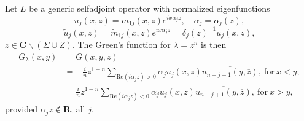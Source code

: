 \documentclass{surv-l}
\theoremstyle{plain}
\theoremstyle{definition}
\numberwithin{equation}{chapter}
\begin{document}
Let $L$ be a generic selfadjoint operator with normalized eigenfunctions
\begin{equation}\label{eq36.1}
u_{j}(x, z)=m_{1j}(x, z)e^{ix\alpha_{j}z},\quad \alpha_{j}=\alpha_{j}(z),
\end{equation}
\begin{equation}\label{eq36.2}
\tilde{u}_{j}(x, z)=\tilde{m}_{1j}(x, z)e^{ix\alpha_{j}z}=\delta_{j}(z)^{-1}u_{j}(x, z),
\end{equation}
$z\in \mathbf{C}\backslash (\Sigma\cup Z)$. The Green's function for $\lambda=z^{n}$ is then
\begin{align}\label{eq36.3}
G_{\lambda}(x,y)&=G(x,y, z)\\ \nonumber
&=-\displaystyle \frac{i}{n}z^{1-n}\sum_{\mathrm{Re}(i\alpha_{j}z)>0}\alpha_{j}u_{j}(x,z)\overline{u_{n-j+1}(y,\overline{z})},\ \mathrm{for}\ x<y;\\ \nonumber
&=\displaystyle \frac{i}{n}z^{1-n}\sum_{\mathrm{Re}(i\alpha_{j}z)<0}\alpha_{j}u_{j}(x,z)\overline{u_{n-j+1}(y,\overline{z})},\ \mathrm{for}\ x>y,
\end{align}
provided $\alpha_{j}z\not\in \mathbf{R}$, all $j$.
\end{document}
